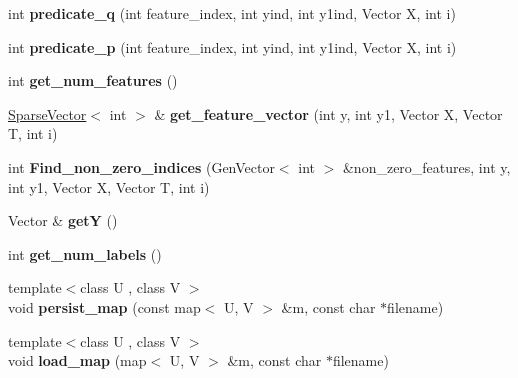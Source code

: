\begin{DoxyCompactItemize}
\item 
\hypertarget{classFeatureset_a259753ad04ad9f374d405223745a98df}{
int {\bfseries predicate\_\-q} (int feature\_\-index, int yind, int y1ind, Vector X, int i)}
\label{classFeatureset_a259753ad04ad9f374d405223745a98df}

\item 
\hypertarget{classFeatureset_a741992091ae2f8d0e7aaface0f3fba05}{
int {\bfseries predicate\_\-p} (int feature\_\-index, int yind, int y1ind, Vector X, int i)}
\label{classFeatureset_a741992091ae2f8d0e7aaface0f3fba05}

\item 
\hypertarget{classFeatureset_a1eef7067f8334d485e19ffcd1b857c66}{
int {\bfseries get\_\-num\_\-features} ()}
\label{classFeatureset_a1eef7067f8334d485e19ffcd1b857c66}

\item 
\hypertarget{classFeatureset_a1d2ba988d102c3983370db12ebfd8076}{
\hyperlink{classSparseVector}{SparseVector}$<$ int $>$ \& {\bfseries get\_\-feature\_\-vector} (int y, int y1, Vector X, Vector T, int i)}
\label{classFeatureset_a1d2ba988d102c3983370db12ebfd8076}

\item 
\hypertarget{classFeatureset_aa346919f7f77239f364848167752dd4a}{
int {\bfseries Find\_\-non\_\-zero\_\-indices} (GenVector$<$ int $>$ \&non\_\-zero\_\-features, int y, int y1, Vector X, Vector T, int i)}
\label{classFeatureset_aa346919f7f77239f364848167752dd4a}

\item 
\hypertarget{classFeatureset_a5dea2a9bd9f0525ca18f846bb9b4fd40}{
Vector \& {\bfseries getY} ()}
\label{classFeatureset_a5dea2a9bd9f0525ca18f846bb9b4fd40}

\item 
\hypertarget{classFeatureset_a3727e26fac67a8a737f35a56b43f50d2}{
int {\bfseries get\_\-num\_\-labels} ()}
\label{classFeatureset_a3727e26fac67a8a737f35a56b43f50d2}

\item 
\hypertarget{classFeatureset_af6989ab6841f858a1e56058b5b53bd49}{
{\footnotesize template$<$class U , class V $>$ }\\void {\bfseries persist\_\-map} (const map$<$ U, V $>$ \&m, const char $\ast$filename)}
\label{classFeatureset_af6989ab6841f858a1e56058b5b53bd49}

\item 
\hypertarget{classFeatureset_abfe3215122352270e4b8aebb11e92c24}{
{\footnotesize template$<$class U , class V $>$ }\\void {\bfseries load\_\-map} (map$<$ U, V $>$ \&m, const char $\ast$filename)}
\label{classFeatureset_abfe3215122352270e4b8aebb11e92c24}


\end{DoxyCompactItemize}
